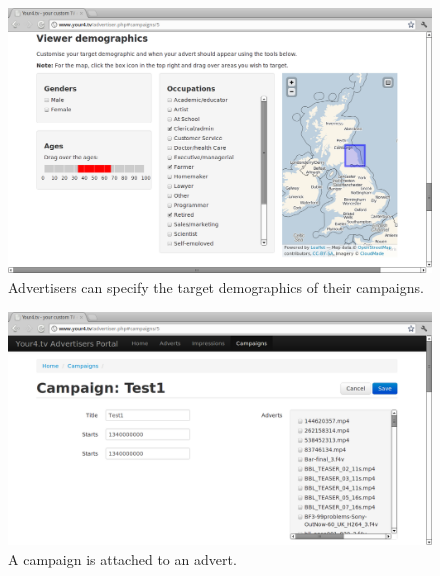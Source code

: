 \begin{figure}[th]
	\centering
	\includegraphics[width=\textwidth,height=0.5\textheight,keepaspectratio]{images/screenshots/advertiser-campaign-demographics.png}
	\caption{Advertisers can specify the target demographics of their campaigns.}
	\label{fig:advertiser-campaign-demographics}
\end{figure}
\begin{figure}[th]
	\centering
	\includegraphics[width=\textwidth,height=0.5\textheight,keepaspectratio]{images/screenshots/advertiser-campaign.png}
	\caption{A campaign is attached to an advert.}
	\label{fig:advertiser-campaign}
\end{figure}
